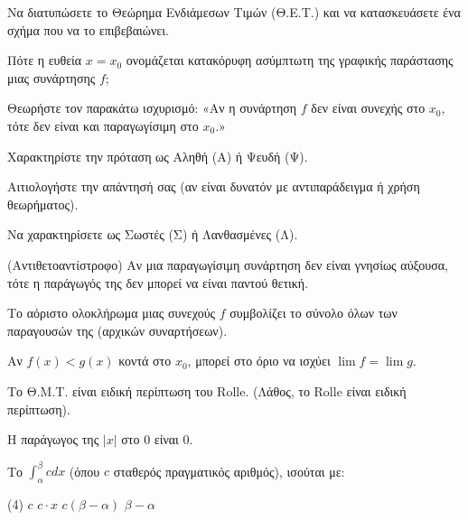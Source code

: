 \documentclass[11pt,a4paper]{article}
\newcommand{\kerkissans}[1]{{\fontfamily{maksf}\selectfont \textbf{#1}}}
\renewcommand{\textdexiakeraia}{}
\newcommand{\dint}{\displaystyle\int}
\newcommand\themanum{A}
\newcounter{thema}[section]
\renewcommand{\thethema}{\arabic{thema}}
\newcommand{\Thema}{\refstepcounter{thema}{\textbf{\textcolor{black}{\faPenSquare\ \  \large \kerkissans{\textbf{\thethemaο\hspace{2mm}Διαγώνισμα - Θέμα \themanum}}}}}\hspace{0mm}}{}
\newenvironment{thema}[1]
{\begin{tcolorbox}[title=\Thema\kerkissans{\textbf{\large{  #1}}},breakable,
enhanced standard,titlerule=0pt,toprule=0pt, rightrule=0pt, bottomrule=0pt,
colback=white,left=0mm,top=1mm,bottom=0mm,
boxrule=0pt,
colframe=white,leftrule=0mm,sharp corners,coltitle=black]
\renewcommand{\themanum}{#1}}
{\end{tcolorbox}}
\begin{document}
\vspace{1cm}

\begin{thema}{A}
\begin{erwthma}
    \item Να διατυπώσετε το Θεώρημα Ενδιάμεσων Τιμών (Θ.Ε.Τ.) και να κατασκευάσετε ένα σχήμα που να το επιβεβαιώνει.
    \item Πότε η ευθεία $x=x_0$ ονομάζεται κατακόρυφη ασύμπτωτη της γραφικής παράστασης μιας συνάρτησης $f$;
    \item Θεωρήστε τον παρακάτω ισχυρισμό:
    «Αν η συνάρτηση $f$ δεν είναι συνεχής στο $x_0$, τότε δεν είναι και παραγωγίσιμη στο $x_0$.»
    \begin{alist}
    \item Χαρακτηρίστε την πρόταση ως Αληθή (Α) ή Ψευδή (Ψ).
    \item Αιτιολογήστε την απάντησή σας (αν είναι δυνατόν με αντιπαράδειγμα ή χρήση θεωρήματος).
    \end{alist}
    \item Να χαρακτηρίσετε ως Σωστές (Σ) ή Λανθασμένες (Λ).
    \begin{alist}
        \item (Αντιθετοαντίστροφο) Αν μια παραγωγίσιμη συνάρτηση δεν είναι γνησίως αύξουσα, τότε η παράγωγός της δεν μπορεί να είναι παντού θετική.
        \item Το αόριστο ολοκλήρωμα μιας συνεχούς $f$ συμβολίζει το σύνολο όλων των παραγουσών της (αρχικών συναρτήσεων).
        \item Αν $f(x)<g(x)$ κοντά στο $x_0$, μπορεί στο όριο να ισχύει $\lim f = \lim g$.
        \item Το Θ.Μ.Τ. είναι ειδική περίπτωση του Rolle. (Λάθος, το Rolle είναι ειδική περίπτωση).
        \item Η παράγωγος της $|x|$ στο 0 είναι 0.
    \end{alist}
    \item Το $\dint_\alpha^\beta c dx$ (όπου $c$ σταθερός πραγματικός αριθμός), ισούται με:
    \begin{tasks}[label=\let\textdexiakeraia\relax\alph*.](4)
        \task $c$
        \task $c\cdot x$
        \task $c(\beta - \alpha)$
        \task $\beta - \alpha$
    \end{tasks}
\end{erwthma}
\end{thema}
\vspace{1cm}
\end{document}
